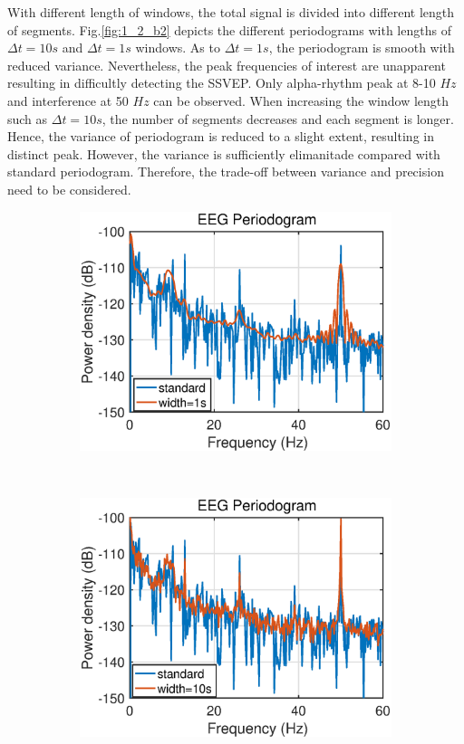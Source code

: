 With different length of windows, the total signal is divided into different length of segments. Fig.\ref{fig:1_2_b2} depicts the different periodograms with lengths of $\Delta t=10s$ and $\Delta t=1s$ windows. As to $\Delta t=1s$, the periodogram is smooth with reduced variance. Nevertheless, the peak frequencies of interest are unapparent resulting in difficultly detecting the SSVEP\cite{mandic}. Only alpha-rhythm peak at 8-10 $Hz$ and interference at 50 $Hz$ can be observed. When increasing the window length such as $\Delta t =10s$, the number of segments decreases and each segment is longer. Hence, the variance of periodogram is reduced to a slight extent, resulting in distinct peak. However, the variance is sufficiently elimanitade compared with standard periodogram. Therefore, the trade-off between variance and precision need to be considered. 
\begin{figure}[htp]
     \centering
     \begin{subfigure}{0.4\textwidth}
         \centering
         \includegraphics[width=\textwidth]{fig/12/12b4.eps}
     \end{subfigure}
     ~
     \begin{subfigure}{0.4\textwidth}
         \centering
         \includegraphics[width=\textwidth]{fig/12/12b3.eps}

\end{subfigure}
\end{figure}
